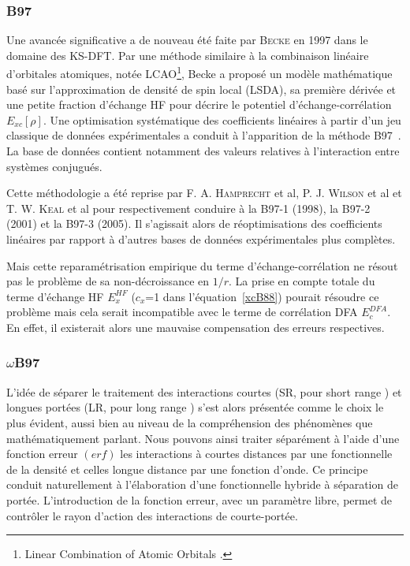 	
	\subsubsection{B97}
	
	Une avancée significative a de nouveau été faite par \textsc{Becke} en 1997 dans le domaine des KS-DFT. Par une méthode similaire à la combinaison linéaire d'orbitales atomiques, notée LCAO\footnote{\og Linear Combination of Atomic Orbitals \fg{}.}, Becke a proposé un modèle mathématique basé sur l'approximation de densité de spin local (LSDA), sa première dérivée et une petite fraction d'échange HF pour décrire le potentiel d'échange-corrélation $E_{xc}[\rho]$. Une optimisation systématique des coefficients linéaires à partir d'un jeu classique de données expérimentales a conduit à l'apparition de la méthode B97~\cite{becke1997density}. La base de données contient notamment des valeurs relatives à l'interaction entre systèmes conjugués.
	
	Cette méthodologie a été reprise par F. A. \textsc{Hamprecht} et al, P. J. \textsc{Wilson} et al et T. W. \textsc{Keal} et al pour respectivement conduire à la B97-1 \cite{hamprecht1998development} (1998), la B97-2 \cite{wilson2001hybrid} (2001) et la B97-3 \cite{keal2005semiempirical} (2005). Il s'agissait alors de réoptimisations des coefficients linéaires par rapport à d'autres bases de données expérimentales plus complètes.
	
	Mais cette reparamétrisation empirique du terme d'échange-corrélation ne résout pas le problème de sa non-décroissance en $1/r$. La prise en compte totale du terme d'échange HF $E_{x}^{HF}$ ($c_{x}$=1 dans l'équation~\ref{xcB88}) pourait résoudre ce problème mais cela serait incompatible avec le terme de corrélation DFA $E_{c}^{DFA}$. En effet, il existerait alors une mauvaise compensation des erreurs respectives.
	
	\subsubsection{$\omega$B97}
	
	L'idée de séparer le traitement des interactions courtes (SR, pour \og short range \fg{}) et longues portées (LR, pour \og long range \fg{}) s'est alors présentée comme le choix le plus évident, aussi bien au niveau de la compréhension des phénomènes que mathématiquement parlant. Nous pouvons ainsi traiter séparément à l'aide d'une fonction erreur $(erf)$ les interactions à courtes distances par une fonctionnelle de la densité et celles longue distance par une fonction d'onde. Ce principe conduit naturellement à l'élaboration d'une fonctionnelle hybride à séparation de portée. L'introduction de la fonction erreur, avec un paramètre libre, permet de contrôler le rayon d'action des interactions de courte-portée.
	
